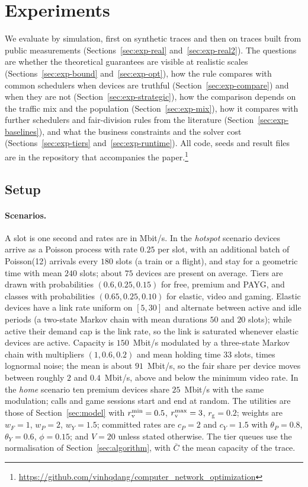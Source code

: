 \section{Experiments}\label{sec:experiments}

We evaluate \repay{} by simulation, first on synthetic traces and then on traces built from public measurements (Sections~\ref{sec:exp-real} and~\ref{sec:exp-real2}).
The questions are whether the theoretical guarantees are visible at realistic scales (Sections~\ref{sec:exp-bound} and~\ref{sec:exp-opt}), how the rule compares with common schedulers when devices are truthful (Section~\ref{sec:exp-compare}) and when they are not (Section~\ref{sec:exp-strategic}), how the comparison depends on the traffic mix and the population (Section~\ref{sec:exp-mix}), how it compares with further schedulers and fair-division rules from the literature (Section~\ref{sec:exp-baselines}), and what the business constraints and the solver cost (Sections~\ref{sec:exp-tiers} and~\ref{sec:exp-runtime}).
All code, seeds and result files are in the repository that accompanies the paper.\footnote{\url{https://github.com/vinhqdang/computer_network_optimization}}

\subsection{Setup}\label{sec:exp-setup}

\paragraph{Scenarios.}
A slot is one second and rates are in Mbit/s.
In the \emph{hotspot} scenario devices arrive as a Poisson process with rate $0.25$ per slot, with an additional batch of Poisson(12) arrivals every $180$ slots (a train or a flight), and stay for a geometric time with mean $240$ slots; about $75$ devices are present on average.
Tiers are drawn with probabilities $(0.6,0.25,0.15)$ for free, premium and PAYG, and classes with probabilities $(0.65,0.25,0.10)$ for elastic, video and gaming.
Elastic devices have a link rate uniform on $[5,30]$ and alternate between active and idle periods (a two-state Markov chain with mean durations $50$ and $20$ slots); while active their demand cap is the link rate, so the link is saturated whenever elastic devices are active.
Capacity is $150$~Mbit/s modulated by a three-state Markov chain with multipliers $(1,0.6,0.2)$ and mean holding time $33$ slots, times lognormal noise; the mean is about $91$~Mbit/s, so the fair share per device moves between roughly $2$ and $0.4$~Mbit/s, above and below the minimum video rate.
In the \emph{home} scenario ten premium devices share $25$~Mbit/s with the same modulation; calls and game sessions start and end at random.
The utilities are those of Section~\ref{sec:model} with $r^{\min}_{\mathrm{v}}=0.5$, $r^{\max}_{\mathrm{v}}=3$, $r_{\mathrm{g}}=0.2$; weights are $w_F=1$, $w_P=2$, $w_Y=1.5$; committed rates are $c_P=2$ and $c_Y=1.5$ with $\theta_P=0.8$, $\theta_Y=0.6$, $\phi=0.15$; and $V=20$ unless stated otherwise. The tier queues use the normalisation of Section~\ref{sec:algorithm}, with $\bar C$ the mean capacity of the trace.

